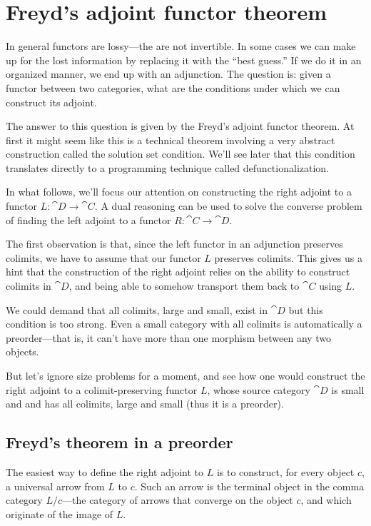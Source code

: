 \documentclass[DaoFP]{subfiles}
\begin{document}
\section{Freyd's adjoint functor theorem}

In general functors are lossy---the are not invertible. In some cases we can make up for the lost information by replacing it with the ``best guess.'' If we do it in an organized manner, we end up with an adjunction. The question is: given a functor between two categories, what are the conditions under which we can construct its adjoint. 

The answer to this question is given by the Freyd's adjoint functor theorem. At first it might seem like this is a technical theorem involving a very abstract construction called the solution set condition. We'll see later that this condition translates directly to a programming technique called defunctionalization. 

In what follows, we'll focus our attention on constructing the right adjoint to a functor $L \colon \cat D \to \cat C$. A dual reasoning can be used to solve the converse problem of finding the left adjoint to a functor $R \colon \cat C \to \cat D$.

The first observation is that, since the left functor in an adjunction preserves colimits, we have to assume that our functor $L$  preserves colimits. This gives us a hint that the construction of the right adjoint relies on the ability to construct colimits in $\cat D$, and being able to somehow transport them back to $\cat C$ using $L$. 

We could demand that all colimits, large and small, exist in $\cat D$ but this condition is too strong. Even a small category with all colimits is automatically a preorder---that is, it can't have more than one morphism between any two objects. 

But let's ignore size problems for a moment, and see how one would construct the right adjoint to a colimit-preserving functor $L$, whose source category $\cat D$ is small and and has all colimits, large and small (thus it is a preorder).

\subsection{Freyd's theorem in a preorder}

The easiest way to define the right adjoint to $L$ is to construct, for every object $c$, a universal arrow from $L$ to $c$. Such an arrow is the terminal object in the comma category $L/c$---the category of arrows that converge on the object $c$, and which originate of the image of $L$.
\end{document}
